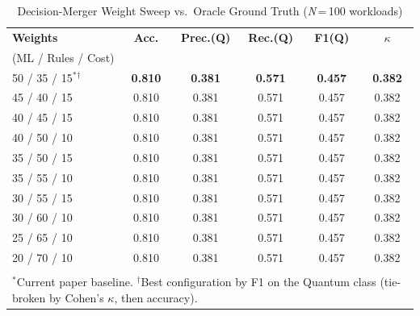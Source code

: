 \begin{table}[!t]
\caption{Decision-Merger Weight Sweep vs.\ Oracle Ground Truth (\textit{N}\,=\,100 workloads)}
\label{tab:weight-sweep}
\centering
\footnotesize
\setlength{\tabcolsep}{3pt}
\begin{tabular}{lccccc}
\toprule
\textbf{Weights} & \textbf{Acc.} & \textbf{Prec.(Q)} & \textbf{Rec.(Q)} & \textbf{F1(Q)} & \textbf{$\kappa$} \\
(ML / Rules / Cost) & & & & & \\
\midrule
50 / 35 / 15$^{*}$$^{\dagger}$ & \textbf{0.810} & \textbf{0.381} & \textbf{0.571} & \textbf{0.457} & \textbf{0.382} \\
45 / 40 / 15 & 0.810 & 0.381 & 0.571 & 0.457 & 0.382 \\
40 / 45 / 15 & 0.810 & 0.381 & 0.571 & 0.457 & 0.382 \\
40 / 50 / 10 & 0.810 & 0.381 & 0.571 & 0.457 & 0.382 \\
35 / 50 / 15 & 0.810 & 0.381 & 0.571 & 0.457 & 0.382 \\
35 / 55 / 10 & 0.810 & 0.381 & 0.571 & 0.457 & 0.382 \\
30 / 55 / 15 & 0.810 & 0.381 & 0.571 & 0.457 & 0.382 \\
30 / 60 / 10 & 0.810 & 0.381 & 0.571 & 0.457 & 0.382 \\
25 / 65 / 10 & 0.810 & 0.381 & 0.571 & 0.457 & 0.382 \\
20 / 70 / 10 & 0.810 & 0.381 & 0.571 & 0.457 & 0.382 \\
\bottomrule
\\[-0.5em]
\multicolumn{6}{p{0.92\columnwidth}}{\footnotesize $^{*}$Current paper baseline. $^{\dagger}$Best configuration by F1 on the Quantum class (tie-broken by Cohen's $\kappa$, then accuracy).} \\
\end{tabular}
\end{table}
